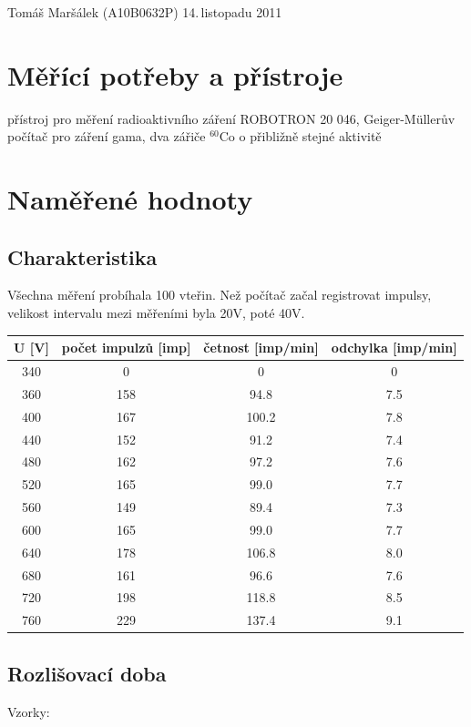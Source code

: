 \documentclass[10pt]{article}
\begin{document}
 {Tomáš Maršálek}
 {(A10B0632P)}
 {14.\,listopadu 2011}

\section{Měřící potřeby a přístroje}
přístroj pro měření radioaktivního záření ROBOTRON 20 046, Geiger-M\"ullerův
počítač pro záření gama, dva zářiče $^{60}$Co o přibližně stejné aktivitě

\section{Naměřené hodnoty}
\subsection{Charakteristika}
Všechna měření probíhala 100 vteřin. Než počítač začal registrovat impulsy,
velikost intervalu mezi měřeními byla 20V, poté 40V. \\

\begin{center}
\begin{tabular}{|c|c|c|c|}
\hline
U [V] & počet impulzů [imp] & četnost [imp/min] & odchylka [imp/min]\\
\hline
340 & 0   & 0      & 0 \\
360 & 158 & 94.8   & 7.5  \\
400 & 167 & 100.2  & 7.8  \\
440 & 152 & 91.2   & 7.4  \\
480 & 162 & 97.2   & 7.6  \\
520 & 165 & 99.0   & 7.7  \\
560 & 149 & 89.4   & 7.3  \\
600 & 165 & 99.0   & 7.7  \\
640 & 178 & 106.8  & 8.0  \\
680 & 161 & 96.6   & 7.6  \\
720 & 198 & 118.8  & 8.5  \\
760 & 229 & 137.4  & 9.1  \\
\hline
\end{tabular}
\end{center}

\vspace{.5cm}
\subsection{Rozlišovací doba}
Vzorky: \\
\end{document}
